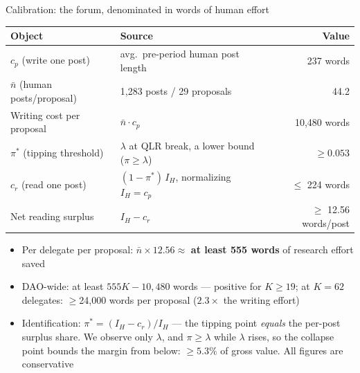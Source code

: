 \documentclass[11pt,aspectratio=169]{beamer}
\begin{document}
\begin{frame}{Calibration: the forum, denominated in words of human effort}
  \centering
  {\footnotesize
  \setlength{\tabcolsep}{5pt}
  \begin{tabular}{llr}
    \toprule
    Object & Source & Value \\
    \midrule
    $c_p$ (write one post) & avg.\ pre-period human post length & 237 words \\
    $\bar{n}$ (human posts/proposal) & 1{,}283 posts / 29 proposals & 44.2 \\
    Writing cost per proposal & $\bar{n} \cdot c_p$ & 10{,}480 words \\
    $\pi^*$ (tipping threshold) & $\lambda$ at QLR break, a lower bound ($\pi \geq \lambda$) & $\geq 0.053$ \\
    $c_r$ (read one post) & $(1-\pi^*)\,I_H$, normalizing $I_H = c_p$ & $\leq$ 224 words \\
    Net reading surplus & $I_H - c_r$ & $\geq$ 12.56 words/post \\
    \bottomrule
  \end{tabular}}
  \vspace{0.4em}
  \begin{itemize}
    \setlength{\itemsep}{0.35em}
    \item \small Per delegate per proposal: $\bar{n} \times 12.56 \approx$
      \alert{\textbf{at least 555 words}} of research effort saved
    \item \small DAO-wide: at least $555K - 10{,}480$ words --- positive for $K \geq 19$; at
      $K = 62$ delegates: \alert{$\geq$24{,}000 words per proposal}
      ($2.3\times$ the writing effort)
    \item \small Identification: $\pi^* = (I_H - c_r)/I_H$ --- \alert{the tipping
      point \emph{equals} the per-post surplus share}. We observe only $\lambda$,
      and $\pi \geq \lambda$ while $\lambda$ rises, so the collapse point bounds
      the margin from below: $\geq 5.3\%$ of gross value. All figures are
      conservative
  \end{itemize}
\end{frame}
\end{document}

